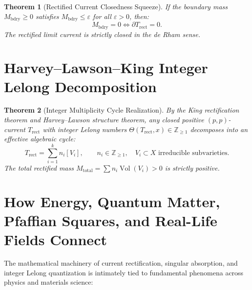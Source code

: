 \documentclass[11pt,a4paper]{article}
\newtheorem{theorem}{Theorem}[section]
\theoremstyle{definition}
\begin{document}
\begin{theorem}[Rectified Current Closedness Squeeze]
If the boundary mass $M_{\mathrm{bdry}} \ge 0$ satisfies $M_{\mathrm{bdry}} \le \varepsilon$ for all $\varepsilon > 0$, then:
\begin{equation}
  M_{\mathrm{bdry}} = 0 \iff \partial T_{\mathrm{rect}} = 0.
\end{equation}
The rectified limit current is strictly closed in the de Rham sense.
\end{theorem}

\section{Harvey--Lawson--King Integer Lelong Decomposition}

\begin{theorem}[Integer Multiplicity Cycle Realization]
By the King rectification theorem and Harvey--Lawson structure theorem, any closed positive $(p,p)$-current $T_{\mathrm{rect}}$ with integer Lelong numbers $\Theta(T_{\mathrm{rect}}, x) \in \mathbb{Z}_{\ge 1}$ decomposes into an effective algebraic cycle:
\begin{equation}
  T_{\mathrm{rect}} = \sum_{i=1}^k n_i [V_i], \qquad n_i \in \mathbb{Z}_{\ge 1}, \quad V_i \subset X \text{ irreducible subvarieties}.
\end{equation}
The total rectified mass $M_{\mathrm{total}} = \sum n_i \operatorname{Vol}(V_i) > 0$ is strictly positive.
\end{theorem}

\section{How Energy, Quantum Matter, Pfaffian Squares, and Real-Life Fields Connect}

The mathematical machinery of current rectification, singular absorption, and integer Lelong quantization is intimately tied to fundamental phenomena across physics and materials science:
\end{document}
